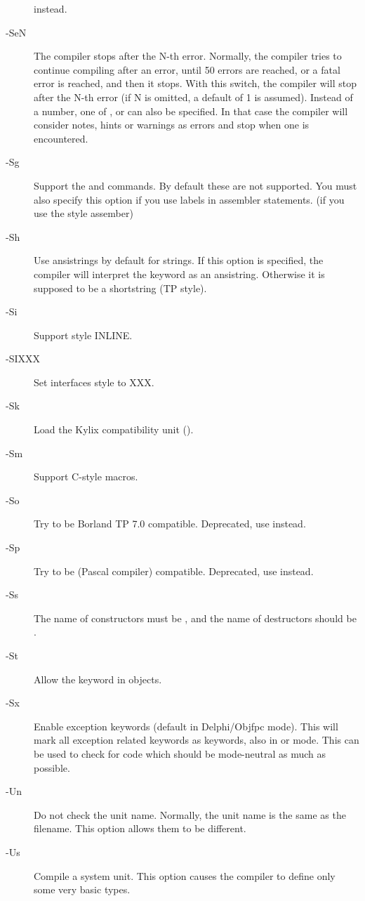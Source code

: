 \begin{description}
 instead. 
\item [-SeN]  The compiler stops after the N-th error. Normally,
the compiler tries to continue compiling after an error, until 50 errors are
reached, or a fatal error is reached, and then it stops. With this switch,
the compiler will stop after the N-th error (if N is omitted, a default of 1
is assumed). Instead of a number, one of ,  or  can also be
specified. 
In that case the compiler will consider notes, hints or warnings as errors and 
stop when one is encountered.
\item [-Sg]  Support the  and  commands. By
default these are not supported. You must also specify this option if you
use labels in assembler statements. (if you use the  style
assember)
\item [-Sh] Use ansistrings by default for strings. If this option is
specified, the compiler will interpret the  keyword as an
ansistring. Otherwise it is supposed to be a shortstring (TP style).
\item [-Si]  Support  style INLINE.
\item [-SIXXX] Set interfaces style to XXX.
\item [-Sk] Load the Kylix compatibility unit ().
\item [-Sm]  Support C-style macros.
\item [-So]  Try to be Borland TP 7.0 compatible. Deprecated, use
 instead.
\item [-Sp]  Try to be  (\gnu Pascal compiler)
compatible. Deprecated, use  instead.
\item [-Ss]  The name of constructors must be , and the
name of destructors should be .
\item [-St]  Allow the  keyword in objects.
\item [-Sx] Enable exception keywords (default in Delphi/Objfpc mode). This
will mark all exception related keywords as keywords, also in \tp or
 mode. This can be used to check for code which should be
mode-neutral as much as possible.
\item [-Un]  Do not check the unit name. Normally, the unit name
is the same as the filename. This option allows them to be different.
\item [-Us]  Compile a system unit. This option causes the
compiler to define only some very basic types.
\end{description}


